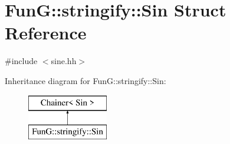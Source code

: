 \hypertarget{structFunG_1_1stringify_1_1Sin}{\section{Fun\-G\-:\-:stringify\-:\-:Sin Struct Reference}
\label{structFunG_1_1stringify_1_1Sin}
}


{\ttfamily \#include $<$sine.\-hh$>$}

Inheritance diagram for Fun\-G\-:\-:stringify\-:\-:Sin\-:\begin{figure}[H]
\begin{center}
\leavevmode
\includegraphics[height=2.000000cm]{structFunG_1_1stringify_1_1Sin}
\end{center}
\end{figure}
